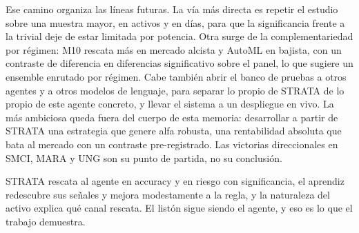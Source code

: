 Ese camino organiza las líneas futuras. La vía más directa es repetir el estudio sobre una muestra mayor, en activos y en días, para que la significancia frente a la trivial deje de estar limitada por potencia. Otra surge de la complementariedad por régimen: M10 rescata más en mercado alcista y AutoML en bajista, con un contraste de diferencia en diferencias significativo sobre el panel, lo que sugiere un ensemble enrutado por régimen. Cabe también abrir el banco de pruebas a otros agentes y a otros modelos de lenguaje, para separar lo propio de STRATA de lo propio de este agente concreto, y llevar el sistema a un despliegue en vivo. La más ambiciosa queda fuera del cuerpo de esta memoria: desarrollar a partir de STRATA una estrategia que genere alfa robusta, una rentabilidad absoluta que bata al mercado con un contraste pre-registrado. Las victorias direccionales en SMCI, MARA y UNG son su punto de partida, no su conclusión.

STRATA rescata al agente en accuracy y en riesgo con significancia, el aprendiz redescubre sus señales y mejora modestamente a la regla, y la naturaleza del activo explica qué canal rescata. El listón sigue siendo el agente, y eso es lo que el trabajo demuestra.
